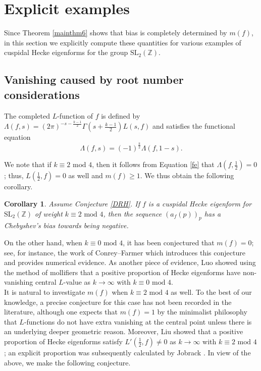 \documentclass[12pt,reqno]{amsart}
\newtheorem{corollary}[theorem]{Corollary}
\theoremstyle{definition}
\numberwithin{equation}{section}
\newcommand{\SL}{\mathrm{SL}}
\begin{document}
\section{Explicit examples} \label{4}

Since Theorem \ref{mainthm6} shows that bias is completely determined by $m(f)$, in this section we explicitly compute these quantities for various examples of cuspidal Hecke eigenforms for the group $\SL_2(\mathbb Z)$.  

\subsection{Vanishing caused by root number considerations} 

The completed $L$-function of $f$ is defined by  
$
\Lambda(f, s) =   (2 \pi)^{-s-\frac{k-1}{2}}  \Gamma \left(s+ \frac{k-1}{2} \right)  L(s, f) 
$
and satisfies the functional equation 
\begin{equation} \label{fe}
\Lambda(f, s) = (-1)^{\frac{k}{2}} \Lambda(f, 1-s). 
\end{equation}

We note that if $k \equiv 2 \textrm{ mod } 4$, then it follows from Equation \eqref{fe} that $\Lambda \left(f, \frac{1}{2} \right)=0$; thus, $L\left(\frac{1}{2}, f\right)=0$ as well and $m(f) \geq 1$. We thus obtain the following corollary. 

\begin{corollary}
Assume Conjecture \ref{DRH}. If $f$ is a cuspidal Hecke eigenform for $\SL_2(\mathbb Z)$ of weight $k \equiv 2 \textrm{ mod } 4$, then the sequence $(a_f(p))_p$ has a Chebyshev's bias towards being negative. 
\end{corollary}

On the other hand, when $k \equiv 0 \textrm{ mod } 4$, it has been conjectured that $m(f)=0$; see, for instance, the work of Conrey--Farmer \cite{CF99} which introduces this conjecture and provides numerical evidence.  As another piece of evidence,  Luo \cite{Luo15} showed using the method of mollifiers that a positive proportion of Hecke eigenforms have non-vanishing central $L$-value as $k \to \infty$ with $k \equiv 0 \textrm{ mod } 4$. 
\\
It is natural to investigate $m(f)$ when $k \equiv 2 \textrm{ mod } 4$ as well. To the best of our knowledge, a precise conjecture for this case has not been recorded in the literature, although one expects that $m(f)=1$ by the minimalist philosophy that
$L$-functions do not have extra vanishing at the central point unless there is an underlying deeper geometric reason. Moreover,  Liu \cite{Liu18} showed that a positive proportion of Hecke eigenforms satisfy $L'(\frac{1}{2}, f) \neq 0$ as $k \to \infty$ with $k \equiv 2 \textrm{ mod } 4$; an explicit proportion was subsequently calculated by Jobrack \cite{Job20}. In view of the above, we make the following conjecture. 
\end{document}
